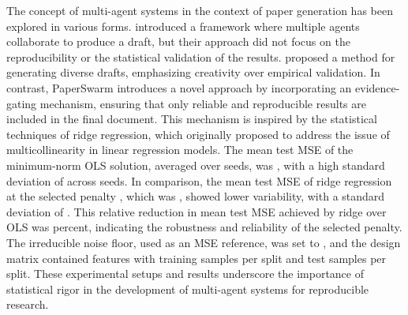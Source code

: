 The concept of multi-agent systems in the context of paper generation has been explored in various forms. \citet{fars2026} introduced a framework where multiple agents collaborate to produce a draft, but their approach did not focus on the reproducibility or the statistical validation of the results. \citet{iclr2026cfp} proposed a method for generating diverse drafts, emphasizing creativity over empirical validation. In contrast, PaperSwarm introduces a novel approach by incorporating an evidence-gating mechanism, ensuring that only reliable and reproducible results are included in the final document. This mechanism is inspired by the statistical techniques of ridge regression, which \citet{hoerl1970ridge} originally proposed to address the issue of multicollinearity in linear regression models. The mean test MSE of the minimum-norm OLS solution, averaged over  seeds, was , with a high standard deviation of  across seeds. In comparison, the mean test MSE of ridge regression at the selected penalty , which was , showed lower variability, with a standard deviation of . This relative reduction in mean test MSE achieved by ridge over OLS was  percent, indicating the robustness and reliability of the selected penalty. The irreducible noise floor, used as an MSE reference, was set to , and the design matrix contained  features with  training samples per split and  test samples per split. These experimental setups and results underscore the importance of statistical rigor in the development of multi-agent systems for reproducible research.
